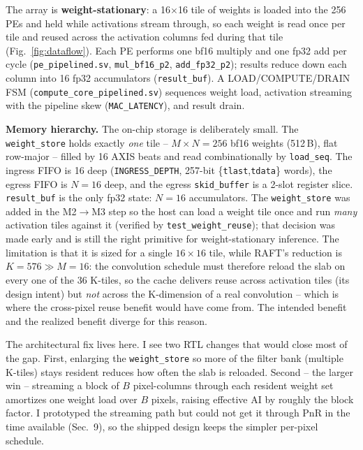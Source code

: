 \documentclass[11pt]{article}
\begin{document}
The array is \textbf{weight-stationary}: a 16$\times$16 tile of weights is
loaded into the 256 PEs and held while activations stream through, so each
weight is read once per tile and reused across the activation columns fed
during that tile (Fig.~\ref{fig:dataflow}). Each PE performs one bf16 multiply
and one fp32 add per cycle (\texttt{pe\_pipelined.sv}, \texttt{mul\_bf16\_p2},
\texttt{add\_fp32\_p2});
results reduce down each column into 16 fp32 accumulators
(\texttt{result\_buf}). A LOAD/COMPUTE/DRAIN FSM (\texttt{compute\_core\_pipelined.sv})
sequences weight load, activation streaming with the pipeline skew
(\texttt{MAC\_LATENCY}), and result drain.

\textbf{Memory hierarchy.} The on-chip storage is deliberately small. The
\texttt{weight\_store} holds exactly \emph{one} tile -- $M\times N=256$ bf16
weights (512\,B), flat row-major -- filled by 16 AXIS beats and read
combinationally by \texttt{load\_seq}. The ingress FIFO is 16 deep
(\texttt{INGRESS\_DEPTH}, 257-bit \{\texttt{tlast},\texttt{tdata}\} words), the
egress FIFO is $N=16$ deep, and the egress \texttt{skid\_buffer} is a 2-slot
register slice. \texttt{result\_buf} is the only fp32 state: $N=16$ accumulators.
The \texttt{weight\_store} was added in the M2$\rightarrow$M3 step so the host
can load a weight tile once and run \emph{many} activation tiles against it
(verified by \texttt{test\_weight\_reuse}); that decision was made early and is
still the right primitive for weight-stationary inference. The limitation is
that it is sized for a single $16\times16$ tile, while RAFT's reduction is
$K=576\gg M=16$: the convolution schedule must therefore reload the slab on
every one of the 36 K-tiles, so the cache delivers reuse across activation
tiles (its design intent) but \emph{not} across the K-dimension of a real
convolution -- which is where the cross-pixel reuse benefit would have come
from. The intended benefit and the realized benefit diverge for this reason.

The architectural fix lives here. I see two RTL changes that would close most
of the gap. First, enlarging the \texttt{weight\_store} so more of the filter
bank (multiple K-tiles) stays resident reduces how often the slab is reloaded.
Second -- the larger win -- streaming a block of $B$ pixel-columns through each
resident weight set amortizes one weight load over $B$ pixels, raising
effective AI by roughly the block factor. I prototyped the streaming path but
could not get it through PnR in the time available (Sec.~9), so the shipped
design keeps the simpler per-pixel schedule.
\end{document}
